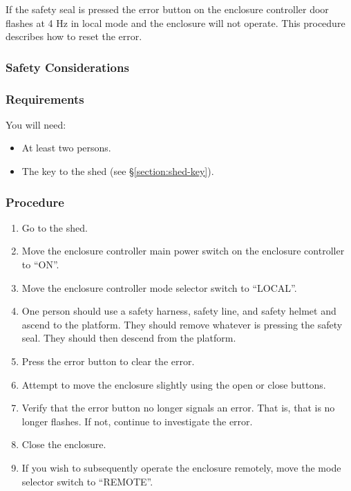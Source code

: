 If the safety seal is pressed the error button on the enclosure controller door flashes at 4 Hz in local mode and the enclosure will not operate. This procedure describes how to reset the error.

\subsubsection{Safety Considerations}


\subsubsection{Requirements}

You will need:
\begin{itemize}
\item At least two persons.
\item The key to the shed (see \S\ref{section:shed-key}).
\end{itemize}

\subsubsection{Procedure}

\begin{enumerate}
\item 
Go to the shed.
\item
Move the enclosure controller main power switch on the enclosure controller to “ON”.
\item
Move the enclosure controller mode selector switch to “LOCAL”.
\item
One person should use a safety harness, safety line, and safety helmet and ascend to the platform. They should remove whatever is pressing the safety seal. They should then descend from the platform.
\item
Press the error button to clear the error.
\item
Attempt to move the enclosure slightly using the open or close buttons.
\item
Verify that the error button no longer signals an error. That is, that is no longer flashes. If not, continue to investigate the error.
\item
Close the enclosure.
\item
If you wish to subsequently operate the enclosure remotely, move the mode selector switch to “REMOTE”.
\end{enumerate}

